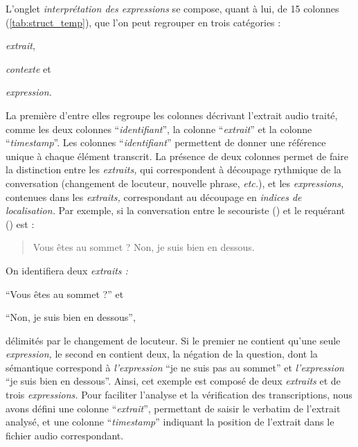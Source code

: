 L'onglet \emph{interprétation des expressions} se compose, quant à
lui, de 15 colonnes (\autoref{tab:struct_temp}), que l'on peut
regrouper en trois catégories :
\begin{enumerate*}[label=(\alph*)]
\item \emph{extrait},
\item \emph{contexte} et
\item \emph{expression.}
\end{enumerate*}
La première d'entre elles regroupe les colonnes décrivant l'extrait
audio traité, comme les deux colonnes \enquote{\emph{identifiant}}, la
colonne \enquote{\emph{extrait}} et la colonne
\enquote{\emph{timestamp}}. Les colonnes \enquote{\emph{identifiant}}
permettent de donner une référence unique à chaque élément
transcrit. La présence de deux colonnes permet de faire la distinction
entre les \emph{extraits,} qui correspondent à découpage rythmique de
la conversation (changement de locuteur, nouvelle phrase,
\emph{etc.}), et les \emph{expressions,} contenues dans les
\emph{extraits,} correspondant au découpage en \emph{indices de
  localisation.} Par exemple, si la conversation entre le secouriste
() et le requérant () est :
%
\begin{quote}
  \begin{dialogue}
    \Sec Vous êtes au sommet ?
    \Req Non, je suis bien en dessous.
  \end{dialogue}
\end{quote}
%
On identifiera deux \emph{extraits :}
%
\begin{enumerate*}[label=(\alph*)]
\item \enquote{Vous êtes au sommet ?} et
\item \enquote{Non, je suis bien en dessous},
\end{enumerate*}
%
délimités par le changement de locuteur. Si le premier ne contient
qu'une seule \emph{expression,} le second en contient deux, la
négation de la question, dont la sémantique correspond à
\emph{l'expression} \enquote{je ne suis pas au sommet} et
\emph{l'expression} \enquote{je suis bien en dessous}. Ainsi, cet
exemple est composé de deux \emph{extraits} et de trois
\emph{expressions.}
%
Pour faciliter l'analyse et la vérification des transcriptions, nous
avons défini une colonne \enquote{\emph{extrait}}, permettant de
saisir le verbatim de l'extrait analysé, et une colonne
\enquote{\emph{timestamp}} indiquant la position de l'extrait dans le
fichier audio correspondant.


